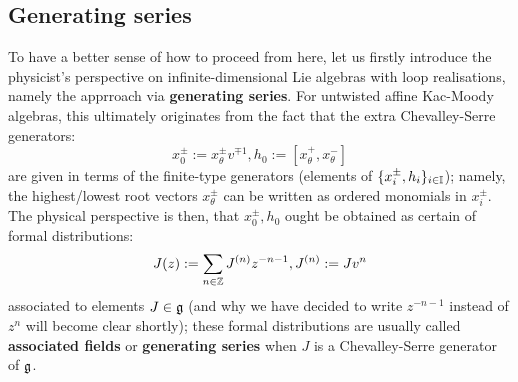         \subsection{Generating series}
            To have a better sense of how to proceed from here, let us firstly introduce the physicist's perspective on infinite-dimensional Lie algebras with loop realisations, namely the apprroach via \textbf{generating series}. For untwisted affine Kac-Moody algebras, this ultimately originates from the fact that the extra  Chevalley-Serre generators:
                $$x_0^{\pm} := x_{\theta}^{\pm} v^{\mp 1}, h_0 := [x_{\theta}^+, x_{\theta}^-]$$
            are given in terms of the finite-type generators (elements of $\{x_i^{\pm}, h_i\}_{i \in \mathbb{I}}$); namely, the highest/lowest root vectors $x_{\theta}^{\pm}$ can be written as ordered monomials in $x_i^{\pm}$. The physical perspective is then, that $x_0^{\pm}, h_0$ ought be obtained as certain  of formal distributions:
                $$J(z) := \sum_{n \in \mathbb{Z}} J^{(n)} z^{-n - 1}, J^{(n)} := J v^n$$
            associated to elements $J \in \mathfrak{g}$ (and why we have decided to write $z^{-n - 1}$ instead of $z^n$ will become clear shortly); these formal distributions are usually called \textbf{associated fields} or \textbf{generating series} when $J$ is a Chevalley-Serre generator of $\mathfrak{g}$.

